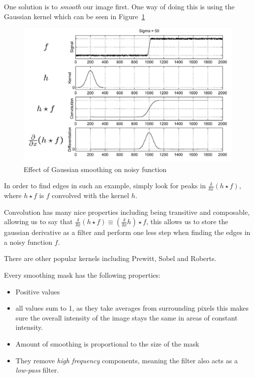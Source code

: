 \documentclass{article}
\begin{document}
One solution is to \textit{smooth} our image first. One way of doing this is using the Gaussian kernel which can be seen in Figure~\ref{fig:Gaussian smoothing}

\begin{figure}[ht]
  \centering
  \includegraphics[scale=0.3]{figures/l3-1.png}
  \caption{\label{fig:Gaussian smoothing} Effect of Gaussian smoothing on noisy function}
\end{figure}

In order to find edges in such an example, simply look for peaks in $\frac{\delta}{\delta x}(h \star f)$, where $h\star f$ is $f$ convolved with the kernel $h$.

Convolution has many nice properties including being transitive and composable, allowing us to say that $\frac{\delta}{\delta x}(h \star f) \equiv (\frac{\delta}{\delta x}h) \star f$, this allows us to store the gaussian derivative as a filter and perform one less step when finding the edges in a noisy function $f$.

There are other popular kernels including Prewitt, Sobel and Roberts.

Every smoothing mask has the following properties:

\begin{itemize}
  \item Positive values
  \item all values sum to 1, as they take averages from surrounding pixels this makes sure the overall intensity of the image stays the same in areas of constant intensity.
  \item Amount of smoothing is proportional to the size of the mask
        \item They remove \textit{high frequency} components, meaning the filter also acts as a \textit{low-pass} filter.
\end{itemize}
\end{document}
